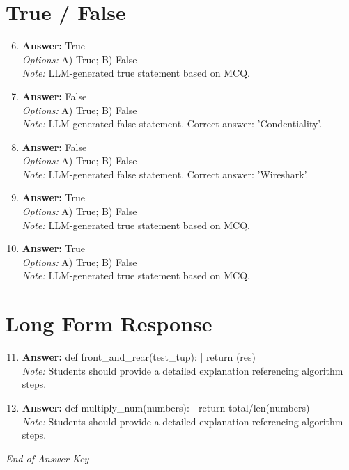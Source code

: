 \documentclass[12pt]{article}
\begin{document}
\section*{True / False}
\begin{enumerate}[label=\arabic*.]
\setcounter{enumi}{5}
\item \textbf{Answer:} True
\\ \textit{Options:} A) True; B) False
\\ \textit{Note:} LLM-generated true statement based on MCQ.
\item \textbf{Answer:} False
\\ \textit{Options:} A) True; B) False
\\ \textit{Note:} LLM-generated false statement. Correct answer: 'Condentiality'.
\item \textbf{Answer:} False
\\ \textit{Options:} A) True; B) False
\\ \textit{Note:} LLM-generated false statement. Correct answer: 'Wireshark'.
\item \textbf{Answer:} True
\\ \textit{Options:} A) True; B) False
\\ \textit{Note:} LLM-generated true statement based on MCQ.
\item \textbf{Answer:} True
\\ \textit{Options:} A) True; B) False
\\ \textit{Note:} LLM-generated true statement based on MCQ.
\end{enumerate}

\section*{Long Form Response}
\begin{enumerate}[label=\arabic*.]
\setcounter{enumi}{10}
\item \textbf{Answer:} def front\_and\_rear(test\_tup): | return (res)
\\ \textit{Note:} Students should provide a detailed explanation referencing algorithm steps.
\item \textbf{Answer:} def multiply\_num(numbers): | return total/len(numbers)
\\ \textit{Note:} Students should provide a detailed explanation referencing algorithm steps.
\end{enumerate}

\vfill
\noindent\textit{End of Answer Key}
\end{document}
